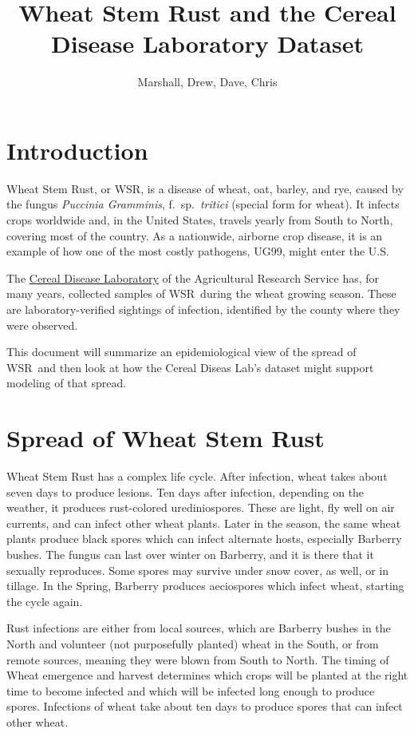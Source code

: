 \documentclass{article}
\title{Wheat Stem Rust and the Cereal Disease Laboratory Dataset}
\author{Marshall, Drew, Dave, Chris}
\newcommand{\wsr}{\textsc{WSR}}
\begin{document}
\maketitle

\section{Introduction}
Wheat Stem Rust, or \wsr, is a disease of wheat, oat, barley, and rye, caused by
the fungus \textit{Puccinia Gramminis}, f.~sp.\ \textit{tritici} (special form for wheat). It infects crops worldwide and, in the United States, travels yearly from South to North, covering most of the country. As a nationwide, airborne crop disease, it is an example of how one of the most costly pathogens, \textsc{UG99}, might enter the U.S.

The \href{http://www.ars.usda.gov/main/site_main.htm?modecode=36-40-05-00}{Cereal Disease Laboratory} of the Agricultural Research Service has, for many years, collected samples of \wsr\ during the wheat growing season. These are laboratory-verified sightings of infection, identified by the county where they were observed.

This document will summarize an epidemiological view of the spread of \wsr\ and then look at how the Cereal Diseas Lab's dataset might support modeling of that spread.

\section{Spread of Wheat Stem Rust}
Wheat Stem Rust has a complex life cycle. After infection, wheat takes about seven days to produce lesions. Ten days after infection, depending on the weather, it produces rust-colored urediniospores. These are light, fly well on air currents, and can infect other wheat plants. Later in the season, the same wheat plants produce black spores which can infect alternate hosts, especially Barberry bushes. The fungus can last over winter on Barberry, and it is there that it sexually reproduces. Some spores may survive under snow cover, as well, or in tillage. In the Spring, Barberry produces aeciospores which infect wheat, starting the cycle again.

Rust infections are either from local sources, which are Barberry bushes in the North and volunteer (not purposefully planted) wheat in the South, or from remote sources, meaning they were blown from South to North. The timing of Wheat emergence and harvest determines which crops will be planted at the right time to become infected and which will be infected long enough to produce spores. Infections of wheat take about ten days to produce spores that can infect other wheat.
\end{document}
